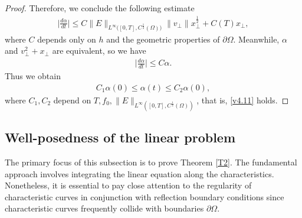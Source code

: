 \documentclass[11pt,reqno]{amsart}%
\theoremstyle{definition}
\theoremstyle{remark}
\begin{document}
\begin{proof}
Therefore, we conclude the following estimate
\begin{align}
\Big|\frac{d \alpha}{d t}\Big|\leq C\|E\|_{L^{\infty}\big([0,T],C^{\frac{1}{2}}(\Omega)\big)}\|v_{\bot}\|x^{\frac{1}{2}}_{\bot}+C(T)x_{\bot},\nonumber
\end{align}
where $C$ depends only on $h$ and the geometric properties of $\partial\Omega$. Meanwhile,  $\alpha$ and $v^{2}_{\bot}+x_{\bot}$ are equivalent, so we have
\begin{align}
\Big|\frac{d \alpha}{d t}\Big|\leq C \alpha. \label{v4.12}
\end{align}
Thus we obtain
\begin{align}
C_{1}\alpha(0)\leq \alpha(t)\leq C_{2} \alpha(0), \nonumber
\end{align}
where $C_{1}, C_{2}$ depend  on
$T,f_{0},\|E\|_{L^{\infty}([0,T],C^{\frac{1}{2}}(\Omega))}$, that is, \eqref{v4.11} holds.
\end{proof}

\subsection{Well-posedness of the linear problem}

The primary focus of this subsection is to prove Theorem \ref{T2}. The fundamental approach involves integrating the linear equation along the characteristics. Nonetheless, it is essential to pay close attention to the regularity of characteristic curves in conjunction with reflection boundary conditions since characteristic curves frequently collide with boundaries  $\partial\Omega$.
\end{document}
